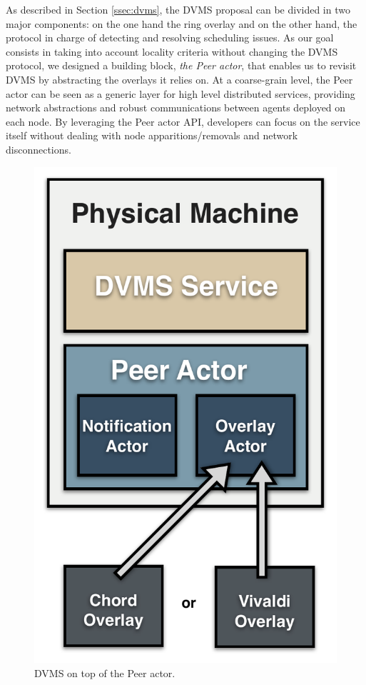 As described in Section \ref{ssec:dvms}, the DVMS proposal can be divided in two major
components: on the one hand the ring overlay and on the other hand, the protocol in charge
of detecting and resolving scheduling issues. As our goal consists in taking into account
locality criteria without changing the DVMS protocol, we designed a building block, \ie
\emph{the Peer actor}, that enables us to revisit DVMS by abstracting the overlays it
relies on. At a coarse-grain level, the Peer actor can be seen as a generic layer for high
level distributed services, providing network abstractions and robust communications
between agents deployed on each node. By leveraging the Peer actor API, developers can
focus on the service itself without dealing with node apparitions/removals and network
disconnections.

\begin{figure}
\vspace{-.7cm}\hspace*{.2cm}
  \includegraphics[width=\linewidth]{Figures/DVMS.pdf}
  \caption{DVMS on top of the Peer actor.}%
  \label{fig:peeractor}%
\end{figure}

